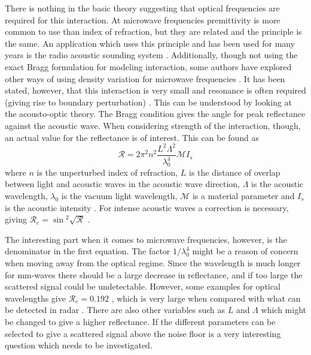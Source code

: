 \documentclass[10pt,a4paper,draft]{scrartcl}
\begin{document}
	There is nothing in the basic theory suggesting that optical frequencies are required for this interaction. At microwave frequencies premittivity is more common to use than index of refraction, but they are related and the principle is the same. An application which uses this principle and has been used for many years is the radio acoustic sounding system \cite{Buerkle2007}. Additionally, though not using the exact Bragg formulation for modeling interaction, some authors have explored other ways of using density variation for microwave frequencies \cite{Lawrence2001}\cite{Merkel2006}. It has been stated, however, that this interaction is very small and resonance is often required (giving rise to boundary perturbation) \cite{Buerkle2007}. This can be understood by looking at the acousto-optic theory. The Bragg condition gives the angle for peak reflectance against the acoustic wave. When considering strength of the interaction, though, an actual value for the reflectance is of interest. This can be found as
	\begin{equation*}
		\mathcal{R} = 2\pi^2n^2 \frac{L^2 \Lambda^2}{\lambda_0^4} \mathcal{M}I_s
	\end{equation*}
	where $n$ is the unperturbed index of refraction, $L$ is the distance of overlap between light and acoustic waves in the acoustic wave direction, $\Lambda$ is the acoustic wavelength, $\lambda_0$ is the vacuum light wavelength, $\mathcal{M}$ is a material parameter and $I_s$ is the acoustic intensity \cite{Saleh2007}. For intense acoustic waves a correction is necessary, giving $\mathcal{R}_e = \sin{^2\sqrt{\mathcal{R}}}$ \cite{Saleh2007}.
	
	The interesting part when it comes to microwave frequencies, however, is the denominator in the first equation. The factor $1/\lambda_0^4$ might be a reason of concern when moving away from the optical regime. Since the wavelength is much longer for mm-waves there should be a large decrease in reflectance, and if too large the scattered signal could be undetectable. However, some examples for optical wavelengths give $\mathcal{R}_e = 0.192$ \cite{Saleh2007}, which is very large when compared with what can be detected in radar \cite{Richards2012}. There are also other variables such as $L$ and $\Lambda$ which might be changed to give a higher reflectance. If the different parameters can be selected to give a scattered signal above the noise floor is a very interesting question which needs to be investigated.
	
\end{document}
